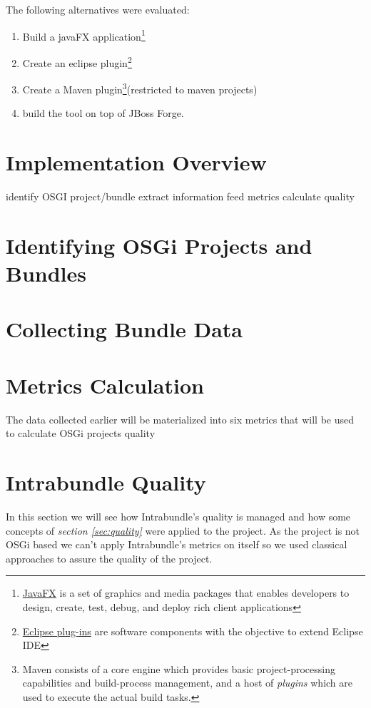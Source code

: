 The following alternatives were evaluated:

\begin{enumerate}
\item Build a javaFX application\footnote{\href{http://docs.oracle.com/javase/8/javase-clienttechnologies.htm}{JavaFX} is a set of graphics and media packages that enables developers to design, create, test, debug, and deploy rich client applications}
\item Create an eclipse plugin\footnote{\href{https://wiki.eclipse.org/FAQ_What_is_a_plug-in%3F}{Eclipse plug-ins} are software components with the objective to extend Eclipse IDE}
\item Create a  Maven plugin\footnote{Maven consists of a core engine which provides basic project-processing capabilities and build-process management, and a host of \emph{plugins} which are used to execute the actual build tasks.}(restricted to maven projects)
\item build the tool on top of JBoss Forge.
\end{enumerate}



\section{Implementation Overview}
identify OSGI project/bundle
extract information
feed metrics
calculate quality

\section{Identifying OSGi Projects and Bundles}

\section{Collecting Bundle Data}

\section{Metrics Calculation}
The data collected earlier will be materialized into six metrics that will be used to calculate OSGi projects quality  

\section{Intrabundle Quality}
In this section we will see how Intrabundle's quality is managed and how some concepts of \textit{section \ref{sec:quality}} were applied to the project. As the project is not OSGi based we can't apply Intrabundle's metrics on itself so we used classical approaches to assure the quality of the project.

